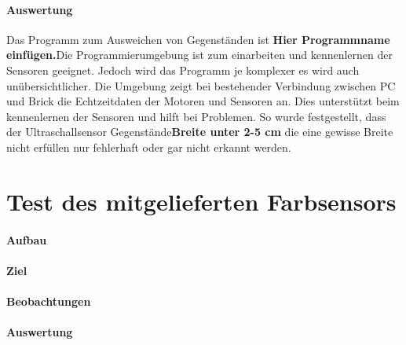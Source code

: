 \paragraph{Auswertung}
Das Programm zum Ausweichen von Gegenständen ist \textbf{Hier Programmname einfügen.}Die Programmierumgebung ist zum einarbeiten und kennenlernen der Sensoren geeignet. Jedoch wird das Programm je komplexer es wird auch unübersichtlicher. Die Umgebung zeigt bei bestehender Verbindung zwischen PC und Brick die Echtzeitdaten der Motoren und Sensoren an. Dies unterstützt beim kennenlernen der Sensoren und hilft bei Problemen. So wurde festgestellt, dass der Ultraschallsensor Gegenstände\textbf{Breite unter 2-5 cm} die eine gewisse Breite nicht erfüllen nur fehlerhaft oder gar nicht erkannt werden.  

\section{Test des mitgelieferten Farbsensors}
\paragraph{Aufbau}
\paragraph{Ziel}
\paragraph{Beobachtungen}
\paragraph{Auswertung}